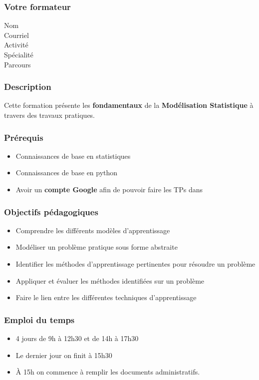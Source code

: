 \begin{frame}
  \frametitle{Votre formateur}
  \begin{description}
  \item[Nom] \TrainerName
  \item[Courriel] \TrainerEmail
  \item[Activité] \TrainerActivity
  \item[Spécialité] \TrainerSpecialization
  \item[Parcours] \TrainerTraining
  \end{description}
\end{frame}

\begin{frame}
  \frametitle{Description}
  Cette formation présente les \textbf{fondamentaux} de la \textbf{Modélisation Statistique} à travers des travaux pratiques. \\
\end{frame}

\begin{frame}
  \frametitle{Prérequis}
  \begin{itemize}
  \item Connaissances de base en statistiques
  \item Connaissances de base en python
  \item Avoir un \textbf{compte Google} afin de pouvoir faire les TPs dans 
  \end{itemize}
\end{frame}

\begin{frame}
  \frametitle{Objectifs pédagogiques}
  \begin{itemize}
  \item Comprendre les différents modèles d'apprentissage
  \item Modéliser un problème pratique sous forme abstraite
  \item Identifier les méthodes d'apprentissage pertinentes pour résoudre un problème
  \item Appliquer et évaluer les méthodes identifiées sur un problème
  \item Faire le lien entre les différentes techniques d'apprentissage
  \end{itemize}
\end{frame}

\begin{frame}
  \frametitle{Emploi du temps}
  \begin{itemize}
  \item 4 jours de 9h à 12h30 et de 14h à 17h30
  \item Le dernier jour on finit à 15h30
  \item À 15h on commence à remplir les documents administratifs.
  \end{itemize}
\end{frame}

